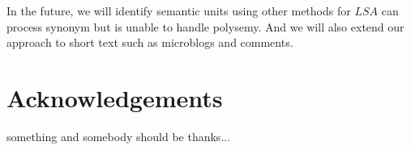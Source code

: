\documentclass{llncs}
\begin{document}
In the future, we will identify semantic units using other methods for $LSA$ can process synonym but is unable to handle polysemy. And we will also extend our approach to short text such as microblogs and comments.

\section{Acknowledgements}
something and somebody should be thanks...





\end{document}

